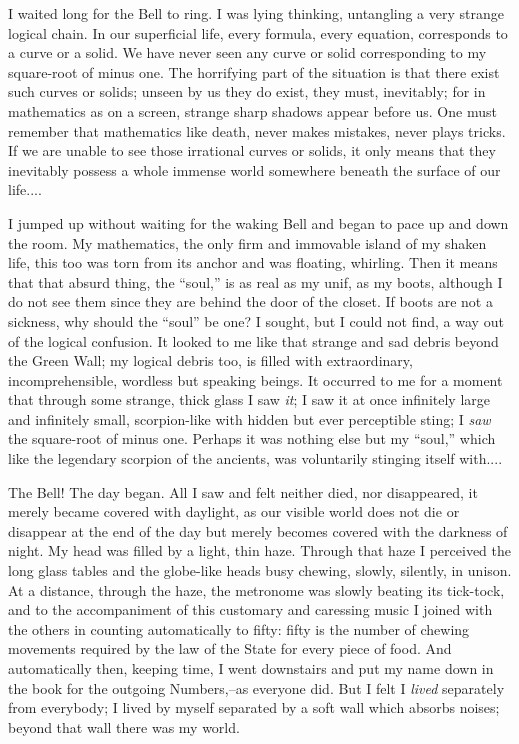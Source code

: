 \documentclass[11pt,openany]{book}
\begin{document}
I waited long for the Bell to ring. I was lying thinking, untangling a very strange logical chain. In our superficial life, every formula, every equation, corresponds to a curve or a solid. We have never seen any curve or solid corresponding to my square-root of minus one. The horrifying part of the situation is that there exist such curves or solids; unseen by us they do exist, they must, inevitably; for in mathematics as on a screen, strange sharp shadows appear before us. One must remember that mathematics like death, never makes mistakes, never plays tricks. If we are unable to see those irrational curves or solids, it only means that they inevitably possess a whole immense world somewhere beneath the surface of our life....

I jumped up without waiting for the waking Bell and began to pace up and down the room. My mathematics, the only firm and immovable island of my shaken life, this too was torn from its anchor and was floating, whirling. Then it means that that absurd thing, the ``soul,'' is as real as my unif, as my boots, although I do not see them since they are behind the door of the closet. If boots are not a sickness, why should the ``soul'' be one? I sought, but I could not find, a way out of the logical confusion. It looked to me like that strange and sad debris beyond the Green Wall; my logical debris too, is filled with extraordinary, incomprehensible, wordless but speaking beings. It occurred to me for a moment that through some strange, thick glass I saw \emph{it}; I saw it at once infinitely large and infinitely small, scorpion-like with hidden but ever perceptible sting; I \emph{saw} the square-root of minus one. Perhaps it was nothing else but my ``soul,'' which like the legendary scorpion of the ancients, was voluntarily stinging itself with....

The Bell! The day began. All I saw and felt neither died, nor disappeared, it merely became covered with daylight, as our visible world does not die or disappear at the end of the day but merely becomes covered with the darkness of night. My head was filled by a light, thin haze. Through that haze I perceived the long glass tables and the globe-like heads busy chewing, slowly, silently, in unison. At a distance, through the haze, the metronome was slowly beating its tick-tock, and to the accompaniment of this customary and caressing music I joined with the others in counting automatically to fifty: fifty is the number of chewing movements required by the law of the State for every piece of food. And automatically then, keeping time, I went downstairs and put my name down in the book for the outgoing Numbers,--as everyone did. But I felt I \emph{lived} separately from everybody; I lived by myself separated by a soft wall which absorbs noises; beyond that wall there was my world.
\end{document}
